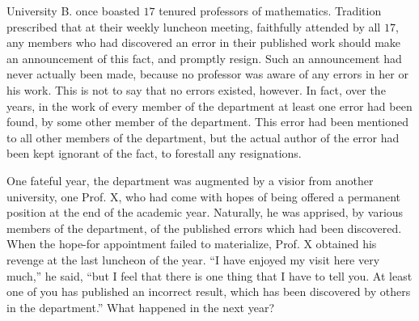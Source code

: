 \begin{pr}[*] \label{2.27} %
  University B. once boasted $17$ tenured professors of
  mathematics. Tradition prescribed that at their weekly
  luncheon meeting, faithfully attended by all $17$, any members
  who had discovered an error in their published work should
  make an announcement of this fact, and promptly resign.
  Such an announcement had never actually been made, because
  no professor was aware of any errors in her or his work.
  This is not to say that no errors existed, however. In fact,
  over the years, in the work of every member of the department
  at least one error had been found, by some other member of the
  department. This error had been mentioned to all other members
  of the department, but the actual author of the error
  had been kept ignorant of the fact, to forestall any
  resignations.
  \par
  One fateful year, the department was augmented by a visior
  from another university, one Prof. X, who had come with
  hopes of being offered a permanent position at the end of
  the academic year. Naturally, he was apprised, by various members
  of the department, of the published errors which had been
  discovered. When the hope-for appointment failed to materialize,
  Prof. X obtained his revenge at the last luncheon of the year.
  ``I have enjoyed my visit here very much,'' he said, ``but
  I feel that there is one thing that I have to tell you.
  At least one of you has published an incorrect result,
  which has been discovered by others in the department.''
  What happened in the next year?
\end{pr}

